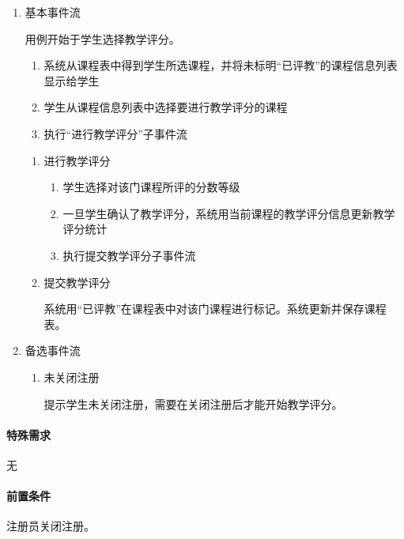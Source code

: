   \begin{enumerate}
    \item 基本事件流
    
    用例开始于学生选择教学评分。
    \begin{enumerate}[(1)]
      \item 系统从课程表中得到学生所选课程，并将未标明“已评教”的课程信息列表显示给学生
      \item 学生从课程信息列表中选择要进行教学评分的课程
      \item 执行“进行教学评分”子事件流
    \end{enumerate}
    
    \begin{enumerate}[{1}.1]
      \item 进行教学评分
      \begin{enumerate}[(1)]
        \item 学生选择对该门课程所评的分数等级
        \item 一旦学生确认了教学评分，系统用当前课程的教学评分信息更新教学评分统计
        \item 执行提交教学评分子事件流
      \end{enumerate}
      
      \item 提交教学评分
      
      \CJKindent 系统用“已评教”在课程表中对该门课程进行标记。系统更新并保存课程表。
    \end{enumerate}
    
    \item 备选事件流
    \begin{enumerate}[{2}.1]
      \item 未关闭注册
      
      \CJKindent 提示学生未关闭注册，需要在关闭注册后才能开始教学评分。
    \end{enumerate}
  \end{enumerate}
  
\paragraph{特殊需求}
  
无
  
\paragraph{前置条件}
  
注册员关闭注册。
  
